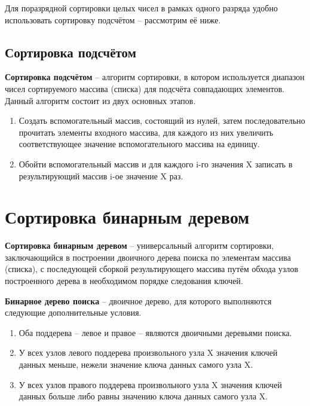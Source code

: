 Для поразрядной сортировки целых чисел в рамках одного разряда удобно использовать сортировку подсчётом -- рассмотрим её ниже.

\subsection{Сортировка подсчётом}

\textbf{Сортировка подсчётом} \cite{radix-sort}  --  алгоритм сортировки, в котором используется диапазон чисел сортируемого массива (списка) для подсчёта совпадающих элементов. Данный алгоритм состоит из двух основных этапов.
\begin{enumerate}
	\item Создать вспомогательный массив, состоящий из нулей, затем последовательно прочитать элементы входного массива, для каждого из них увеличить соответствующее значение вспомогательного массива на единицу.
	\item Обойти  вспомогательный массив и для каждого i-го значения X записать в результирующий массив i-ое значение X раз.
\end{enumerate}

\section{Сортировка бинарным деревом}
\textbf{Сортировка бинарным деревом} \cite{bst-sort}  -- универсальный алгоритм сортировки, заключающийся в построении двоичного дерева поиска по элементам массива (списка), с последующей сборкой результирующего массива путём обхода узлов построенного дерева в необходимом порядке следования ключей.
	

\textbf{Бинарное дерево поиска } \cite{bst-sort}  -- двоичное дерево, для которого выполняются следующие дополнительные условия.
\begin{enumerate}
	\item Оба поддерева -- левое и правое -- являются двоичными деревьями поиска.
	\item У всех узлов левого поддерева произвольного узла X значения ключей данных меньше, нежели значение ключа данных самого узла X.
	\item У всех узлов правого поддерева произвольного узла X значения ключей данных больше либо равны значению ключа данных самого узла X.
\end{enumerate}


